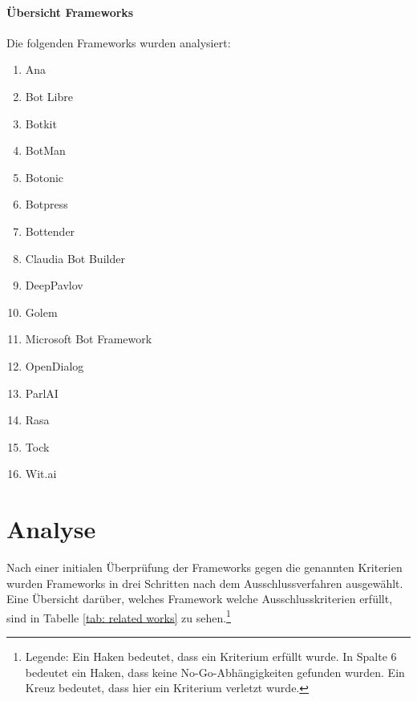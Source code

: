     \paragraph{Übersicht Frameworks}
    Die folgenden Frameworks wurden analysiert:
    \begin{enumerate}
        \item Ana \cite{anachat}
        \item Bot Libre \cite{botlibre}
        \item Botkit \cite{botkit}
        \item BotMan \cite{botman}
        \item Botonic \cite{botonic}
        \item Botpress \cite{botpress}
        \item Bottender \cite{bottender}
        \item Claudia Bot Builder \cite{claudia-bot-builder}
        \item DeepPavlov \cite{deepavlov}
        \item Golem  \cite{golem}
        \item Microsoft Bot Framework  \cite{ms-bot}
        \item OpenDialog \cite{opendialog}
        \item ParlAI \cite{parl-ai}
        \item Rasa \cite{rasa}
        \item Tock \cite{tock}
        \item Wit.ai \cite{wit}
    \end{enumerate}

    \section{Analyse} \label{VerwandteArbeiten: Analyse}
        Nach einer initialen Überprüfung der Frameworks gegen die genannten Kriterien wurden Frameworks in drei Schritten nach dem Ausschlussverfahren ausgewählt. Eine Übersicht darüber, welches Framework welche Ausschlusskriterien erfüllt, sind in Tabelle \ref*{tab: related works} zu sehen.\footnote{Legende: Ein Haken bedeutet, dass ein Kriterium erfüllt wurde. In Spalte 6 bedeutet ein Haken, dass keine No-Go-Abhängigkeiten gefunden wurden. Ein Kreuz bedeutet, dass hier ein Kriterium verletzt wurde.}
    
